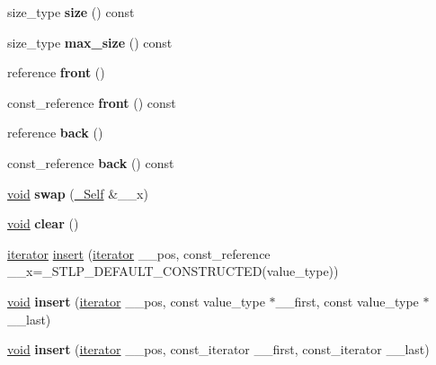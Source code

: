 \begin{DoxyCompactItemize}
size\+\_\+type {\bfseries size} () const
\item 
\mbox{\label{classlist_ac23562cfa1fff0e097be9499f7454907}} 
size\+\_\+type {\bfseries max\+\_\+size} () const
\item 
\mbox{\label{classlist_ae17efa5f51e4cfbfa875347f237af9af}} 
reference {\bfseries front} ()
\item 
\mbox{\label{classlist_a18ffb45b1c4d292a21bf7b9c4066b087}} 
const\+\_\+reference {\bfseries front} () const
\item 
\mbox{\label{classlist_a0f81365b027e9f32e0a987c176f0ad3c}} 
reference {\bfseries back} ()
\item 
\mbox{\label{classlist_a1846831a069a25a9a45d6b9e38f971d6}} 
const\+\_\+reference {\bfseries back} () const
\item 
\mbox{\label{classlist_a5d70b1952414c6bc2f1ae45748e28502}} 
\hyperlink{interfacevoid}{void} {\bfseries swap} (\hyperlink{classlist}{\+\_\+\+Self} \&\+\_\+\+\_\+x)
\item 
\mbox{\label{classlist_ae1074b0be66f99b2b9f657d240e8e589}} 
\hyperlink{interfacevoid}{void} {\bfseries clear} ()
\item 
\hyperlink{structiterator}{iterator} \hyperlink{classlist_a7582d74b4ac5f51c3a5e585ca495cc0a}{insert} (\hyperlink{structiterator}{iterator} \+\_\+\+\_\+pos, const\+\_\+reference \+\_\+\+\_\+x=\+\_\+\+S\+T\+L\+P\+\_\+\+D\+E\+F\+A\+U\+L\+T\+\_\+\+C\+O\+N\+S\+T\+R\+U\+C\+T\+ED(value\+\_\+type))
\item 
\mbox{\label{classlist_ad6e87ef5045b3b44941ef300cf636df0}} 
\hyperlink{interfacevoid}{void} {\bfseries insert} (\hyperlink{structiterator}{iterator} \+\_\+\+\_\+pos, const value\+\_\+type $\ast$\+\_\+\+\_\+first, const value\+\_\+type $\ast$\+\_\+\+\_\+last)
\item 
\mbox{\label{classlist_adf9c0573fd7755249cdef99c9ff75377}} 
\hyperlink{interfacevoid}{void} {\bfseries insert} (\hyperlink{structiterator}{iterator} \+\_\+\+\_\+pos, const\+\_\+iterator \+\_\+\+\_\+first, const\+\_\+iterator \+\_\+\+\_\+last)

\end{DoxyCompactItemize}
